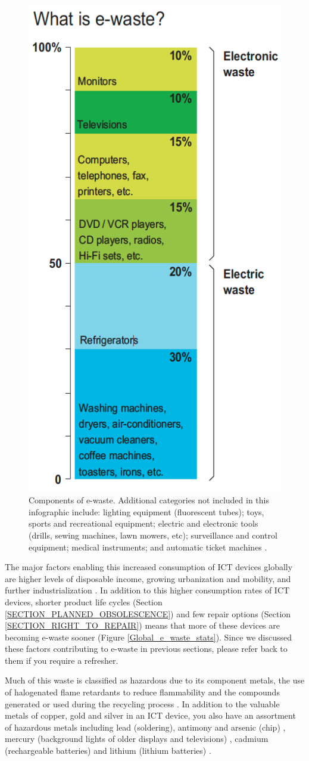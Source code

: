 \documentclass{article}
\begin{document}
\begin{figure}[h]
    \includegraphics[width=.35 \textwidth]{./images/e-waste.png}
    \centering
    \caption{Components of e-waste. Additional categories not included in this infographic include: lighting equipment (fluorescent tubes); toys, sports and recreational equipment; electric and electronic tools (drills, sewing machines, lawn mowers, etc); surveillance and control equipment; medical instruments; and automatic ticket machines \cite{bournay2006vital}.}
    \label{e-waste}
\end{figure}

The major factors enabling this increased consumption of ICT devices globally are higher levels of disposable income, growing urbanization and mobility, and further industrialization \cite{forti2020global}. In addition to this higher consumption rates of ICT devices, shorter product life cycles (Section \ref{SECTION_PLANNED_OBSOLESCENCE}) and few repair options (Section \ref{SECTION_RIGHT_TO_REPAIR}) means that more of these devices are becoming e-waste sooner (Figure \ref{Global_e_waste_stats}). Since we discussed these factors contributing to e-waste in previous sections, please refer back to them if you require a refresher.

Much of this waste is classified as hazardous due to its component metals, the use of halogenated flame retardants to reduce flammability and the compounds generated or used during the recycling process \cite{williams2011environmental, forti2020global}. In addition to the valuable metals of copper, gold and silver in an ICT device, you also have an assortment of hazardous metals including lead (soldering), antimony and arsenic (chip) \cite{compoundinterest2014, williams2011environmental}, mercury (background lights of older displays and televisions) \cite{balde2018waste}, cadmium (rechargeable batteries)  \cite{williams2011environmental, forti2020global} and lithium (lithium batteries) \cite{compoundinterest2014, kumar2017waste}.
\end{document}
